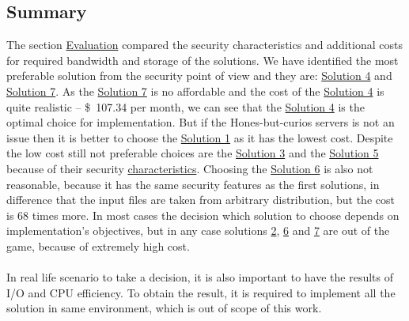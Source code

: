 \documentclass[12pt]{article}
\begin{document}




\subsection{Summary}
\label{sub:SummeryEva}

The section \hyperref[sec:5]{Evaluation} compared the security characteristics and additional costs for required bandwidth and storage of the solutions. We have identified the most preferable solution from the security point of view and they are: \hyperref[sub:Soltuion4]{Solution 4} and \hyperref[sub:Soltuion7]{Solution 7}. As the \hyperref[sub:Soltuion7]{Solution 7} is no affordable and the cost of the \hyperref[sub:Soltuion4]{Solution 4} is quite realistic -- \$\ 107.34 per month, we can see that the  \hyperref[sub:Soltuion4]{Solution 4} is the optimal choice for implementation. But if the Hones-but-curios servers  is not an issue then it is better to choose the \hyperref[sub:Soltuion1]{Solution 1} as it has the lowest cost. Despite the low cost still not preferable choices are the \hyperref[sub:Soltuion3]{Solution 3} and the \hyperref[sub:Soltuion5]{Solution 5} because of their security \hyperref[table:Security]{characteristics}. Choosing the \hyperref[sub:Soltuion6]{Solution 6} is also not reasonable, because it has the same security features  as the first solutions, in difference that the input files are taken from arbitrary distribution, but the cost is $68$ times more. In most cases the decision which solution to choose depends on implementation's objectives, but in any case solutions \hyperref[sub:Soltuion2]{2}, \hyperref[sub:Soltuion6]{6} and \hyperref[sub:Soltuion7]{7} are out of the game, because of extremely high cost.\\\\ 
In real life scenario to take a decision, it is also important to have the results of I/O and CPU efficiency.  To obtain the result, it is required to implement all the solution in same environment, which is out of scope of this work.
\end{document}
